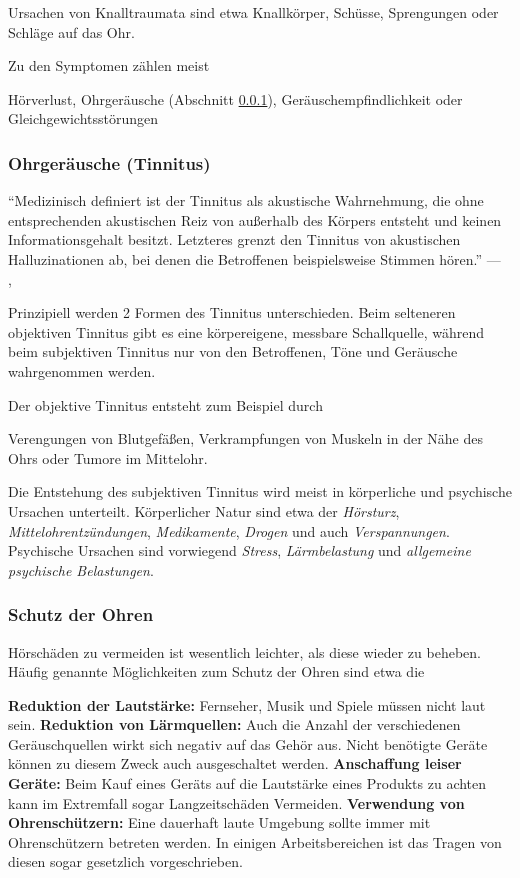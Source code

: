 Ursachen von Knalltraumata sind etwa Knallkörper, Schüsse, Sprengungen oder Schläge auf das Ohr.

Zu den Symptomen zählen meist
\begin{outline}
\1 Hörverlust,
\1 Ohrgeräusche (Abschnitt \ref{subsubsec:tinnitus}),
\1 Geräuschempfindlichkeit oder
\1 Gleichgewichtsstörungen
\end{outline}

\newpage
\subsubsection{Ohrgeräusche (Tinnitus)}\label{subsubsec:tinnitus}
\enquote{Medizinisch definiert ist der Tinnitus als akustische Wahrnehmung, die ohne entsprechenden akustischen Reiz von außerhalb des Körpers entsteht und keinen Informationsgehalt besitzt. Letzteres grenzt den Tinnitus von akustischen Halluzinationen ab, bei denen die Betroffenen beispielsweise Stimmen hören.} --- \citeauthor{netdoktor:tinnitus},~\citeyear{netdoktor:tinnitus}~\cite{netdoktor:tinnitus}

Prinzipiell werden 2 Formen des Tinnitus unterschieden. Beim selteneren objektiven Tinnitus gibt es eine körpereigene, messbare Schallquelle, während beim subjektiven Tinnitus nur von den Betroffenen, Töne und Geräusche wahrgenommen werden.

Der objektive Tinnitus entsteht zum Beispiel durch
\begin{outline}
\1 Verengungen von Blutgefäßen,
\1 Verkrampfungen von Muskeln in der Nähe des Ohrs oder
\1 Tumore im Mittelohr.
\end{outline}

Die Entstehung des subjektiven Tinnitus wird meist in körperliche und psychische Ursachen unterteilt. Körperlicher Natur sind etwa der \textit{Hörsturz}, \textit{Mittelohrentzündungen}, \textit{Medikamente}, \textit{Drogen} und auch \textit{Verspannungen}. Psychische Ursachen sind vorwiegend \textit{Stress}, \textit{Lärmbelastung} und \textit{allgemeine psychische Belastungen}.

\subsubsection{Schutz der Ohren}
Hörschäden zu vermeiden ist wesentlich leichter, als diese wieder zu beheben. Häufig genannte Möglichkeiten zum Schutz der Ohren sind etwa die
\begin{outline}
\1 \textbf{Reduktion der Lautstärke:} Fernseher, Musik und Spiele müssen nicht laut sein.
\1 \textbf{Reduktion von Lärmquellen:} Auch die Anzahl der verschiedenen Geräuschquellen wirkt sich negativ auf das Gehör aus. Nicht benötigte Geräte können zu diesem Zweck auch ausgeschaltet werden.
\1 \textbf{Anschaffung leiser Geräte:} Beim Kauf eines Geräts auf die Lautstärke eines Produkts zu achten kann im Extremfall sogar Langzeitschäden Vermeiden.
\1 \textbf{Verwendung von Ohrenschützern:} Eine dauerhaft laute Umgebung sollte immer mit Ohrenschützern betreten werden. In einigen Arbeitsbereichen ist das Tragen von diesen sogar gesetzlich vorgeschrieben.
\end{outline}